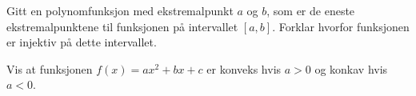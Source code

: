 





\opgt

\nes

\nes

\nes

\nes
{}
Gitt en polynomfunksjon med ekstremalpunkt $ a $ og $ b $, som er de eneste ekstremalpunktene til funksjonen på intervallet $ [a, b] $. Forklar hvorfor funksjonen er injektiv på dette intervallet.

Vis at funksjonen $ {f(x)=a x^2+b x + c}  $ er konveks hvis $ {a>0} $ og konkav hvis $ {a<0} $.

